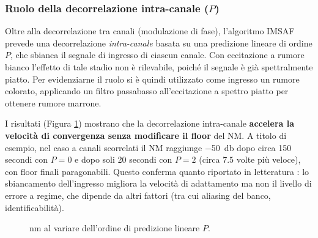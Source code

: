 \documentclass[11pt,a4paper]{article}
\begin{document}
	\subsubsection{Ruolo della decorrelazione intra-canale ($P$)}
	Oltre alla decorrelazione tra canali (modulazione di fase), l'algoritmo IMSAF prevede una decorrelazione \emph{intra-canale} basata su una predizione lineare di ordine $P$, che sbianca il segnale di ingresso di ciascun canale.
	Con eccitazione a rumore bianco l'effetto di tale stadio non è rilevabile, poiché il segnale è già spettralmente piatto.
	Per evidenziarne il ruolo si è quindi utilizzato come ingresso un rumore colorato, applicando un filtro passabasso all'eccitazione a spettro piatto per ottenere rumore marrone.
	
	I risultati (Figura \ref{fig:nm_p_comparison}) mostrano che la decorrelazione intra-canale \textbf{accelera la velocità di convergenza senza modificare il floor} del NM. 
	A titolo di esempio, nel caso a canali scorrelati il NM raggiunge \SI{-50}{\decibel} dopo circa 150 secondi con $P=0$ e dopo soli 20 secondi con $P=2$ (circa $7.5$ volte più veloce), con floor finali paragonabili.
	Questo conferma quanto riportato in letteratura \cite{11464373}: lo sbiancamento dell'ingresso migliora la velocità di adattamento ma non il livello di errore a regime, che dipende da altri fattori (tra cui aliasing del banco, identificabilità).
	
	\begin{figure}[H]
		\centering
		\caption{\ac{nm} al variare dell'ordine di predizione lineare $P$.}
		\label{fig:nm_p_comparison}
	\end{figure}
	
\end{document}
